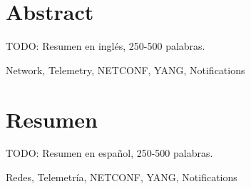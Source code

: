 \chapter*{Abstract}

\begin{abstractEn}
TODO: Resumen en inglés, 250-500 palabras.


\end{abstractEn}

\begin{keywordsEn}
Network, Telemetry, NETCONF, YANG, Notifications
\end{keywordsEn}

\chapter*{Resumen}

\begin{abstractEs}
TODO: Resumen en español, 250-500 palabras.


\end{abstractEs}

\begin{keywordsEs}
Redes, Telemetría, NETCONF, YANG, Notifications
\end{keywordsEs}
